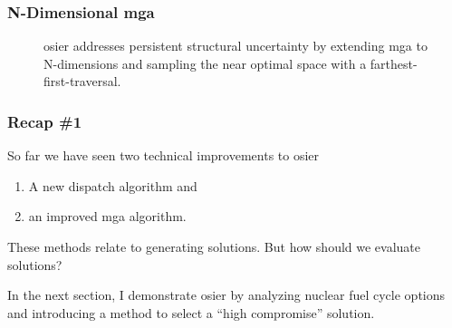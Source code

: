 \begin{frame}
    \frametitle{N-Dimensional \gls{mga}}
    \begin{figure}
        \centering
        \resizebox{\columnwidth}{!}{}
        \caption{\gls{osier} addresses persistent structural uncertainty by
        extending \gls{mga} to N-dimensions and sampling the near optimal space
        with a farthest-first-traversal.}
    \end{figure}
\end{frame}


\begin{frame}
    \frametitle{Recap \#1}

    So far we have seen two technical improvements to \gls{osier}

    \begin{enumerate}
        \item A new dispatch algorithm and
        \item an improved \gls{mga} algorithm.
    \end{enumerate}

    These methods relate to generating solutions. But how should we evaluate 
    solutions?
    
    In the next section, I demonstrate \gls{osier} by analyzing nuclear fuel cycle options
    and introducing a method to select a ``high compromise'' solution.
\end{frame}